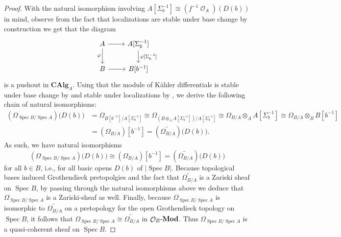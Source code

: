 \documentclass{amsart}
\theoremstyle{definition}
\DeclareMathOperator{\Ocal}{\mathcal{O}}
\DeclareMathOperator{\Spec}{Spec}
\newcommand{\CAlg}[1]{\mathbf{CAlg}_{#1}}
\newcommand{\Mod}[1]{{#1}\textnormal{-}\mathbf{Mod}}
\newcommand{\Kah}[2]{\Omega_{{#1}/{#2}}}
\numberwithin{equation}{subsection}
\begin{document}
\begin{proof}
With the natural isomorphism involving $A[\Sigma_b^{-1}] \cong (f^{-1}\Ocal_A)(D(b))$ in mind, observe from the fact that localizations are stable under base change by construction we get that the diagram
\[
\begin{tikzcd}
A \ar[r]{}{} \ar[d, swap]{}{\varphi} & A[\Sigma_b^{-1}] \ar[d]{}{\varphi[\Sigma_b^{-1}]} \\
B \ar[r, swap]{}{} & B[b^{-1}]
\end{tikzcd}
\]
is a pushout in $\CAlg{A}$. Using that the module of K{\"a}hler differentials is stable under base change by \cite[Proposition 16.4]{Eisenbud} and stable under localizations by \cite[Proposition 16.9]{Eisenbud}, we derive the following chain of natural isomorphisms:
\begin{align*}
\left(\Kah{\Spec B}{\Spec A}\right)\big(D(b)\big) &= \Kah{B[b^{-1}]}{A[\Sigma_b^{-1}]} \cong \Kah{\left(B \otimes_A A[\Sigma_b^{-1}]\right)}{A[\Sigma_b^{-1}]} \cong \Kah{B}{A} \otimes_A A[\Sigma_b^{-1}] \cong \Kah{B}{A} \otimes_B B[b^{-1}] \\
&= \left(\Kah{B}{A}\right)[b^{-1}] = \left(\widetilde{\Kah{B}{A}}\right)\big(D(b)\big).
\end{align*}
As such, we have natural isomorphisms
\[
\left(\Kah{\Spec B}{\Spec A}\right)\big(D(b)\big) \cong  \left(\Kah{B}{A}\right)[b^{-1}] = \left(\widetilde{\Kah{B}{A}}\right)\big(D(b)\big)
\]
for all $b \in B$, i.e., for all basic opens $D(b)$ of $\lvert \Spec B \rvert$. Because topological bases induced Grothendieck pretopolgies and the fact that $\widetilde{\Kah{B}{A}}$ is a Zariski sheaf on $\Spec B$, by passing through the natural isomorphisms above we deduce that $\Kah{\Spec B}{\Spec A}$ is a Zariski-sheaf as well. Finally, because $\Kah{\Spec B}{\Spec A}$ is isomorphic to $\widetilde{\Kah{B}{A}}$ on a pretopology for the open Grothendieck topology on $\Spec B$, it follows that $\Kah{\Spec B}{\Spec A} \cong \widetilde{\Kah{B}{A}}$ in $\Mod{\Ocal_B}$. Thus $\Kah{\Spec B}{\Spec A}$ is a quasi-coherent sheaf on $\Spec B$.
\end{proof}
\end{document}
